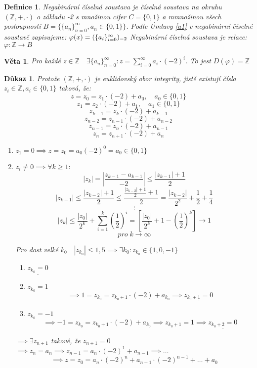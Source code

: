 \documentclass[12pt]{book}
\newtheorem{definice}{Definice}
\newtheorem{veta}{Věta}
\newtheorem*{dukaz}{Důkaz}
\begin{document}
\begin{definice}
	Negabinární číselná soustava je číselná soustava na okruhu $(\mathbb{Z},+,\cdot)$ o základu -2 s množinou cifer $C=\{0,1\}$ a mmnožinou všech posloupností
	$B=\{\{a_n\}_{n=0}^\infty,a_n \in \{0,1\} \}$.\newline
	Podle Úmluvy \ref{u1} v negabinární číselné soustavě zapisujeme:
	$\varphi(x) = (\{a_i\}_{i=0}^{\infty})_{-2}$\newline
	Negabinární číselná soustava je relace:
	$\varphi:\mathbb{Z}\to B$
\end{definice}
\begin{veta}
	Pro každé $z \in \mathbb{Z} \quad \exists\{a_n\}_{n=0}^\infty:z=\sum_{i=0}^{\infty}a_i\cdot(-2)^i$. To jest $D(\varphi)=\mathbb{Z}$
\end{veta}
\begin{dukaz}\label{negaDF}
	Protože $(\mathbb{Z},+,\cdot)$ je euklidovský obor integrity, jistě existují čísla $z_i\in\mathbb{Z}, a_i\in\{0,1\}$ taková, že:
	$$ z=z_0=z_1\cdot(-2)+a_0,\quad a_0\in\{0,1\}$$
	$$ z_1=z_2\cdot(-2)+a_1,\quad a_1\in\{0,1\}$$
	$$ z_{k-1}=z_k\cdot(-2)+a_{k-1}$$
	$$ z_{n-2}=z_{n-1}\cdot(-2)+a_{n-2}$$
	$$ z_{n-1}=z_n\cdot(-2)+a_{n-1}$$
	$$ z_n=z_{n+1}\cdot(-2)+a_n$$
	\begin{enumerate}
		\item[$\alpha)$] $z_1=0 \implies z=z_0=a_0(-2)^0=a_0\in\{0,1\}$
		\item[$\beta)$]  $z_i \ne 0 \implies \forall k \ge 1:$
		$$|z_k|=\left|\frac{z_{k-1}-a_{k-1}}{-2}\right|\le \frac{|z_{k-1}|+1}{2}$$
		$$|z_{k-1}|\le\frac{|z_{k-2}|+1}{2}\le\frac{\frac{|z_{k-2}|+1}{2}+1}{2}=\frac{|z_{k-2}|}{2^2}+\frac{1}{2}+\frac{1}{4}$$
		$$\vdots$$
		$$|z_k|\le\frac{|z_0|}{2^k}+\sum_{i=1}^{k}\left(\frac{1}{2}\right)^i=\left[\frac{|z_0|}{2^k}+1-\left(\frac{1}{2}\right)^k \right]\to 1 $$
		$$ pro\; k \to \infty $$
		
		Pro dost velké $k_0 \quad |z_{k_0}|\le1,5 \implies \exists k_0:z_{k_0}\in\{1,0,-1\}$
		\begin{enumerate}
			\item[a)] $\underline{z_{k_0}=0}$
			\item[b)]$z_{k_0}=1$
			$$\implies 1=z_{k_0}=z_{k_0+1}\cdot(-2)+a_{k_0}\implies \underline{z_{k_0+1}=0}$$
			\item[c)]$z_{k_0}=-1$
			$$\implies -1=z_{k_0}=z_{k_0+1}\cdot(-2)+a_{k_0}\implies z_{k_0+1}=1\implies \underline{z_{k_0+2}=0}$$ 
			\end{enumerate}
		$\implies \exists z_{n+1}$ takové, že $z_{n+1}=0$\newline
		$\implies z_n = a_n \implies z_{n-1}=a_n\cdot(-2)^1+a_{n-1}\implies \dots$
		$$\implies z=z_0=a_n\cdot(-2)^n+a_{n-1}\cdot(-2)^{n-1}+\dots+a_0$$
	\end{enumerate}
\end{dukaz}
\end{document}
